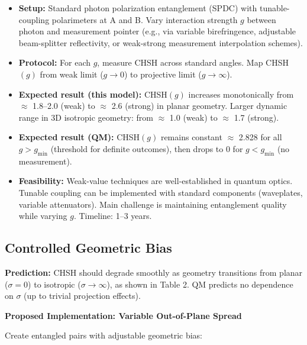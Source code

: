 \documentclass[11pt,a4paper]{article}
\theoremstyle{definition}
\theoremstyle{remark}
\begin{document}
\begin{itemize}
\item \textbf{Setup:} Standard photon polarization entanglement (SPDC) with tunable-coupling polarimeters at A and B. Vary interaction strength $g$ between photon and measurement pointer (e.g., via variable birefringence, adjustable beam-splitter reflectivity, or weak-strong measurement interpolation schemes).

\item \textbf{Protocol:} For each $g$, measure CHSH across standard angles. Map CHSH$(g)$ from weak limit ($g \to 0$) to projective limit ($g \to \infty$).

\item \textbf{Expected result (this model):} CHSH$(g)$ increases monotonically from $\approx$ 1.8--2.0 (weak) to $\approx$ 2.6 (strong) in planar geometry. Larger dynamic range in 3D isotropic geometry: from $\approx$ 1.0 (weak) to $\approx$ 1.7 (strong).

\item \textbf{Expected result (QM):} CHSH$(g)$ remains constant $\approx$ 2.828 for all $g > g_{\mathrm{min}}$ (threshold for definite outcomes), then drops to 0 for $g < g_{\mathrm{min}}$ (no measurement).

\item \textbf{Feasibility:} Weak-value techniques are well-established in quantum optics. Tunable coupling can be implemented with standard components (waveplates, variable attenuators). Main challenge is maintaining entanglement quality while varying $g$. Timeline: 1--3 years.
\end{itemize}

\subsection{Controlled Geometric Bias}

\textbf{Prediction:} CHSH should degrade smoothly as geometry transitions from planar ($\sigma = 0$) to isotropic ($\sigma \to \infty$), as shown in Table 2. QM predicts no dependence on $\sigma$ (up to trivial projection effects).

\textbf{Proposed Implementation: Variable Out-of-Plane Spread}

Create entangled pairs with adjustable geometric bias:
\end{document}
